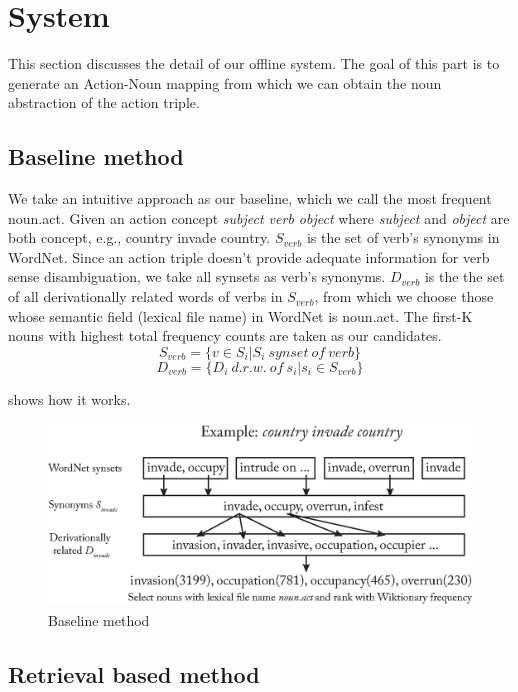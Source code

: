 \section{System}
This section discusses the detail of our offline system. 
The goal of this part is to generate an Action-Noun mapping
from which we can obtain the noun abstraction of the 
action triple.
\subsection{Baseline method}
We take an intuitive approach as our baseline, which we call the most frequent noun.act. Given an action concept \emph{subject verb object} where \emph{subject} and \emph{object} are both concept, e.g., country invade country. $S_{verb}$ is the set of verb's synonyms in WordNet. Since an action triple doesn't provide adequate information for verb sense disambiguation, we take all synsets as verb's synonyms. $D_{verb}$ is the the set of all derivationally related words of verbs in $S_{verb}$, from which we choose those whose semantic field (lexical file name) in WordNet is noun.act. The first-K nouns with highest total frequency counts are taken as our candidates.
\begin{equation*}
    S_{verb} = \{{ v \in S_i | S_i \ synset \ of \ verb}\}
\end{equation*}
\begin{equation*}
    D_{verb} = \{{ D_i \ d.r.w.  \ of \ s_i | s_i \in S_{verb}}\}
\end{equation*}


 shows how it works.


\begin{figure}[h]
\includegraphics[width=\columnwidth]{img/baseline.eps}
\caption{Baseline method}
\label{fig:baseline}
\end{figure}

\subsection{Retrieval based method}

